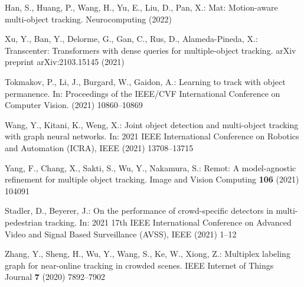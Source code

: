 \documentclass[runningheads]{llncs}
\begin{document}
\begin{thebibliography}{10}
Han, S., Huang, P., Wang, H., Yu, E., Liu, D., Pan, X.:
\newblock Mat: Motion-aware multi-object tracking.
\newblock Neurocomputing (2022)

Xu, Y., Ban, Y., Delorme, G., Gan, C., Rus, D., Alameda-Pineda, X.:
\newblock Transcenter: Transformers with dense queries for multiple-object
  tracking.
\newblock arXiv preprint arXiv:2103.15145 (2021)

Tokmakov, P., Li, J., Burgard, W., Gaidon, A.:
\newblock Learning to track with object permanence.
\newblock In: Proceedings of the IEEE/CVF International Conference on Computer
  Vision. (2021)  10860--10869

Wang, Y., Kitani, K., Weng, X.:
\newblock Joint object detection and multi-object tracking with graph neural
  networks.
\newblock In: 2021 IEEE International Conference on Robotics and Automation
  (ICRA), IEEE (2021)  13708--13715

Yang, F., Chang, X., Sakti, S., Wu, Y., Nakamura, S.:
\newblock Remot: A model-agnostic refinement for multiple object tracking.
\newblock Image and Vision Computing \textbf{106} (2021)  104091

Stadler, D., Beyerer, J.:
\newblock On the performance of crowd-specific detectors in multi-pedestrian
  tracking.
\newblock In: 2021 17th IEEE International Conference on Advanced Video and
  Signal Based Surveillance (AVSS), IEEE (2021)  1--12

Zhang, Y., Sheng, H., Wu, Y., Wang, S., Ke, W., Xiong, Z.:
\newblock Multiplex labeling graph for near-online tracking in crowded scenes.
\newblock IEEE Internet of Things Journal \textbf{7} (2020)  7892--7902

\end{thebibliography}
 

\end{document}
